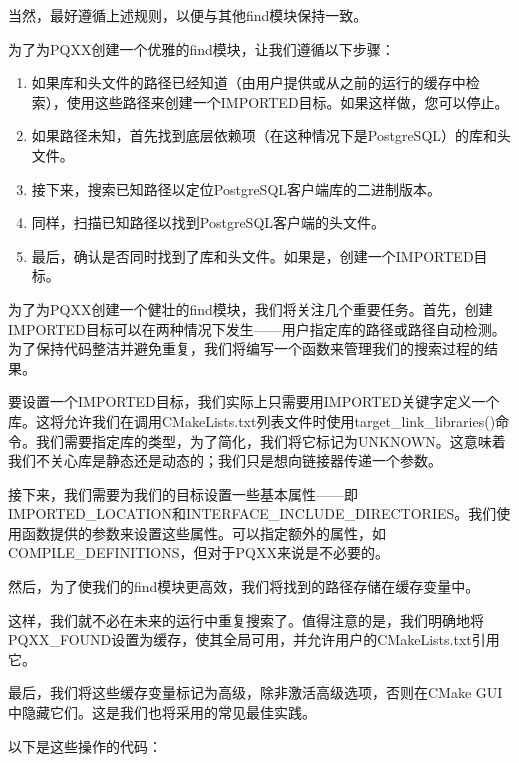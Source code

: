 当然，最好遵循上述规则，以便与其他find模块保持一致。

为了为PQXX创建一个优雅的find模块，让我们遵循以下步骤：

\begin{enumerate}
\item
如果库和头文件的路径已经知道（由用户提供或从之前的运行的缓存中检索），使用这些路径来创建一个IMPORTED目标。如果这样做，您可以停止。

\item
如果路径未知，首先找到底层依赖项（在这种情况下是PostgreSQL）的库和头文件。

\item
接下来，搜索已知路径以定位PostgreSQL客户端库的二进制版本。

\item
同样，扫描已知路径以找到PostgreSQL客户端的头文件。

\item
最后，确认是否同时找到了库和头文件。如果是，创建一个IMPORTED目标。
\end{enumerate}

为了为PQXX创建一个健壮的find模块，我们将关注几个重要任务。首先，创建IMPORTED目标可以在两种情况下发生——用户指定库的路径或路径自动检测。为了保持代码整洁并避免重复，我们将编写一个函数来管理我们的搜索过程的结果。


要设置一个IMPORTED目标，我们实际上只需要用IMPORTED关键字定义一个库。这将允许我们在调用CMakeLists.txt列表文件时使用target\_link\_libraries()命令。我们需要指定库的类型，为了简化，我们将它标记为UNKNOWN。这意味着我们不关心库是静态还是动态的；我们只是想向链接器传递一个参数。

接下来，我们需要为我们的目标设置一些基本属性——即IMPORTED\_LOCATION和INTERFACE\_INCLUDE\_DIRECTORIES。我们使用函数提供的参数来设置这些属性。可以指定额外的属性，如COMPILE\_DEFINITIONS，但对于PQXX来说是不必要的。

然后，为了使我们的find模块更高效，我们将找到的路径存储在缓存变量中。

这样，我们就不必在未来的运行中重复搜索了。值得注意的是，我们明确地将PQXX\_FOUND设置为缓存，使其全局可用，并允许用户的CMakeLists.txt引用它。

最后，我们将这些缓存变量标记为高级，除非激活高级选项，否则在CMake GUI中隐藏它们。这是我们也将采用的常见最佳实践。

以下是这些操作的代码：


